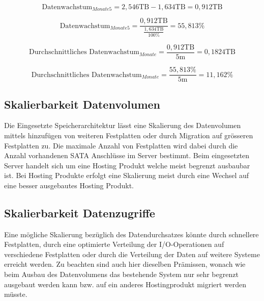 \begin{equation}
\mbox{Datenwachstum}_{Monate5} = 2,546  \mathrm{TB} - 1,634 \mathrm{TB} =  0,912 \mathrm{TB}
\label{eqn:Verfügbarkeit_5Monate}
\end{equation}

\begin{equation}
\mbox{Datenwachstum}_{Monate5} = \frac{0,912 \mathrm{TB}}{\frac{1,634 \mathrm{TB}}{100 \%}} =  55,813\%
\label{eqn:Verfügbarkeit_5Monate_in_Prozent}
\end{equation}

\begin{equation}
\mbox{Durchschnittliches Datenwachstum}_{Monate} = \frac{0,912 \mathrm{TB}}{5\mathrm{m}} =  0,1824 \mathrm{TB}
\label{eqn:Verfügbarkeit_1Monate}
\end{equation}

\begin{equation}
\mbox{Durchschnittliches Datenwachstum}_{Monate} = \frac{55,813\%}{5 \mathrm{m}} = 11,162\%
\label{eqn:Verfügbarkeit_1Monate_in_Prozent}
\end{equation}

\subsection{Skalierbarkeit Datenvolumen}\label{AnalyseSkalierbarkeitDatenvolumen}
Die Eingesetzte Speicherarchitektur lässt eine Skalierung des Datenvolumen mittels hinzufügen von weiteren Festplatten oder durch Migration auf grösseren Festplatten zu. Die maximale Anzahl von Festplatten wird dabei durch die Anzahl vorhandenen SATA Anschlüsse im Server bestimmt. Beim eingesetzten Server handelt sich um eine Hosting Produkt welche meist begrenzt ausbaubar ist. Bei Hosting Produkte erfolgt eine Skalierung meist durch eine Wechsel auf eine besser ausgebautes Hosting Produkt. 

\subsection{Skalierbarkeit Datenzugriffe}
Eine mögliche Skalierung bezüglich des Datendurchsatzes könnte durch schnellere Festplatten, durch eine optimierte Verteilung der I/O-Operationen auf verschiedene Festplatten oder durch die Verteilung der Daten auf weitere Systeme erreicht werden. Zu beachten sind auch hier dieselben Prämissen, wonach wie beim Ausbau des Datenvolumens das bestehende System nur sehr begrenzt ausgebaut werden kann bzw. auf ein anderes Hostingprodukt migriert werden müsste.

